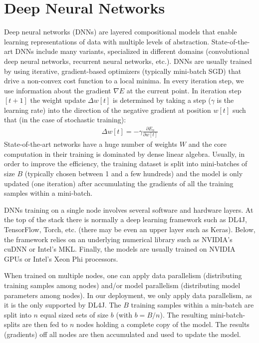 \documentclass[journal]{IEEEtran}
\begin{document}
\section{Deep Neural Networks}
\label{sec:spark}

Deep neural networks (DNNs) are layered compositional models that enable learning representations of data with multiple levels of abstraction. State-of-the-art DNNs include many variants, specialized in different domains (convolutional deep neural networks, recurrent neural networks, etc.). DNNs are usually trained by using iterative, gradient-based optimizers (typically mini-batch SGD) that drive a non-convex cost function to a local minima. In every iteration step, we use information about the gradient $\nabla E$ at the current point. In iteration step $[t + 1]$ the weight update $\Delta w[t]$ is determined by taking a step ($\gamma$ is the learning rate) into the direction of the negative gradient at position $w[t]$ such that (in the case of stochastic training):
\begin{align}
\Delta w[t] = - \gamma \frac{\partial E_n}{\partial w[t]}
\end{align}
State-of-the-art networks have a huge number of weights $W$ and the core computation in their training is dominated by dense linear algebra. Usually, in order to improve the efficiency, the training dataset is split into mini-batches of size $B$ (typically chosen between 1 and a few hundreds) and the model is only updated (one iteration) after accumulating the gradients of all the training samples within a mini-batch.

DNNs training on a single node involves several software and hardware layers. At the top of the stack there is normally a deep learning framework such as DL4J, TensorFlow, Torch, etc. (there may be even an upper layer such as Keras). Below, the framework relies on an underlying numerical library such as NVIDIA's cuDNN or Intel's MKL. Finally, the models are usually trained on NVIDIA GPUs or Intel's Xeon Phi processors. 

When trained on multiple nodes, one can apply data parallelism (distributing training samples among nodes) and/or model parallelism (distributing model parameters among nodes). In our deployment, we only apply data parallelism, as it is the only supported by DL4J. The $B$ training samples within a min-batch are split into $n$ equal sized sets of size $b$ (with $b = B/n$). The resulting mini-batch-splits are then fed to $n$ nodes holding a complete copy of the model. The results (gradients) off all nodes are then accumulated and used to update the model.
\end{document}
